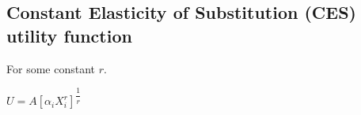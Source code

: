 
\subsection{Constant Elasticity of Substitution (CES) utility function}

For some constant \(r\).

\(U=A[\alpha_i X_i^r]^{\dfrac{1}{r}}\)

